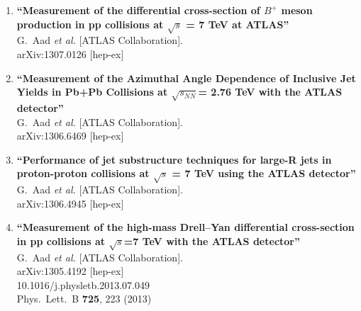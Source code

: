 \documentclass{article}
\begin{document}
\begin{enumerate}


\item%
{\bf ``Measurement of the differential cross-section of $B^+$ meson production in pp collisions at $\sqrt{s}$ = 7 TeV at ATLAS''}
  \\{}G.~Aad {\it et al.}  [ATLAS Collaboration].
  \\{}arXiv:1307.0126 [hep-ex]
  



\item%
{\bf ``Measurement of the Azimuthal Angle Dependence of Inclusive Jet Yields in Pb+Pb Collisions at $\sqrt{s_{NN}}$= 2.76 TeV with the ATLAS detector''}
  \\{}G.~Aad {\it et al.}  [ATLAS Collaboration].
  \\{}arXiv:1306.6469 [hep-ex]
  



\item%
{\bf ``Performance of jet substructure techniques for large-R jets in proton-proton collisions at $\sqrt{s}$ = 7 TeV using the ATLAS detector''}
  \\{}G.~Aad {\it et al.}  [ATLAS Collaboration].
  \\{}arXiv:1306.4945 [hep-ex]
  


\item%
{\bf ``Measurement of the high-mass Drell--Yan differential cross-section in pp collisions at $\sqrt{s}$=7 TeV with the ATLAS detector''}
  \\{}G.~Aad {\it et al.}  [ATLAS Collaboration].
  \\{}arXiv:1305.4192 [hep-ex]
    \\{}10.1016/j.physletb.2013.07.049
\\{}Phys.\ Lett.\ B {\bf 725}, 223 (2013) %



\end{enumerate}
\end{document}
